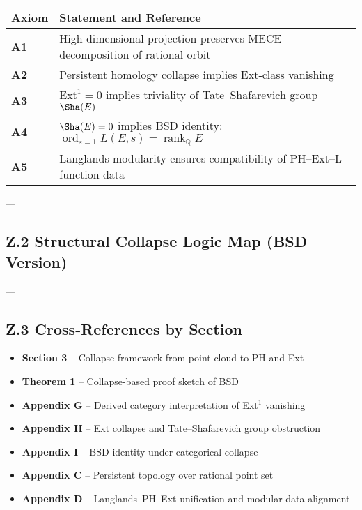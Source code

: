 \begin{tabular}{ll}
\textbf{Axiom} & \textbf{Statement and Reference} \\
\hline
\textbf{A1} & High-dimensional projection preserves MECE decomposition of rational orbit \quad [Appendix C] \\
\textbf{A2} & Persistent homology collapse implies Ext-class vanishing \quad [Appendix B, G] \\
\textbf{A3} & \( \mathrm{Ext}^1 = 0 \) implies triviality of Tate–Shafarevich group \( \Sha(E) \) \quad [Appendix H] \\
\textbf{A4} & \( \Sha(E) = 0 \) implies BSD identity: \( \operatorname{ord}_{s=1} L(E,s) = \operatorname{rank}_\mathbb{Q} E \) \quad [Appendix I] \\
\textbf{A5} & Langlands modularity ensures compatibility of PH–Ext–L-function data \quad [Appendix D] \\
\end{tabular}

---

\subsection*{Z.2 Structural Collapse Logic Map (BSD Version)}

\begin{center}
\end{center}

---

\subsection*{Z.3 Cross-References by Section}

\begin{itemize}
  \item \textbf{Section 3} – Collapse framework from point cloud to PH and Ext
  \item \textbf{Theorem 1} – Collapse-based proof sketch of BSD
  \item \textbf{Appendix G} – Derived category interpretation of Ext$^1$ vanishing
  \item \textbf{Appendix H} – Ext collapse and Tate–Shafarevich group obstruction
  \item \textbf{Appendix I} – BSD identity under categorical collapse
  \item \textbf{Appendix C} – Persistent topology over rational point set
  \item \textbf{Appendix D} – Langlands–PH–Ext unification and modular data alignment
\end{itemize}

